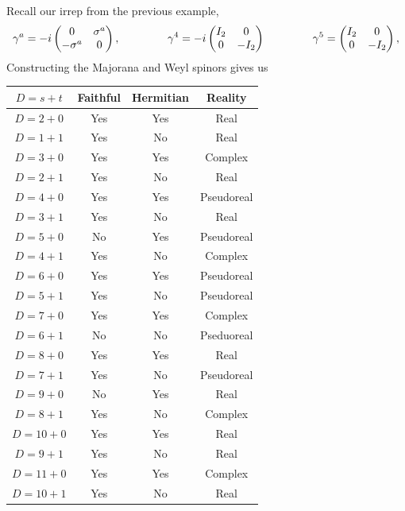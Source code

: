 \documentclass[11pt]{article}
\begin{document}
\begin{eexample}
    [Majorana and Weyl spinors in $D = 3 + 1$]
    Recall our irrep from the previous example,
    \begin{align*}
        \gamma^a = - i \begin{pmatrix}
            0 & \sigma^a\\
            - \sigma^a & 0
        \end{pmatrix},
        \hspace{1.5cm}
        \gamma^4 = -i \begin{pmatrix}
            I_2 & 0\\
            0 & -I_2
        \end{pmatrix}
        \hspace{1.5cm}
        \gamma^5 = \begin{pmatrix}
            I_2 & 0\\
            0 & -I_2
        \end{pmatrix},
    \end{align*}
    Constructing the Majorana and Weyl spinors gives us 
\end{eexample}


\begin{table}[H]
    \centering
    \begin{tabular}{|c|c|c|c|}
        \hline
        $D = s + t$ & Faithful & Hermitian & Reality\\
        \hline
        $D = 2 + 0$ & Yes & Yes & Real\\
        $D = 1 + 1$ & Yes & No & Real\\
        $D = 3 + 0$ & Yes & Yes & Complex\\
        $D = 2 + 1$ & Yes & No & Real\\
        $D = 4 + 0$ & Yes & Yes & Pseudoreal\\
        $D = 3 + 1$ & Yes & No & Real\\
        $D = 5 + 0$ & No & Yes & Pseudoreal\\
        $D = 4 + 1$ & Yes & No & Complex \\
        $D = 6 + 0$ & Yes & Yes & Pseudoreal\\
        $D = 5 + 1$ & Yes & No & Pseudoreal\\
        $D = 7 + 0$ & Yes & Yes & Complex\\
        $D = 6 + 1$ & No & No & Pseduoreal\\
        $D = 8 + 0$ & Yes & Yes & Real\\
        $D = 7 + 1$ & Yes & No & Pseudoreal\\
        $D = 9 + 0$ & No & Yes & Real\\
        $D = 8 + 1$ & Yes & No & Complex\\
        $D = 10 + 0$ & Yes & Yes & Real\\
        $D = 9 + 1$ & Yes & No & Real\\
        $D = 11 + 0$ & Yes & Yes & Complex\\
        $D = 10 + 1$ & Yes & No & Real\\
        \hline 
    \end{tabular}
\end{table}
\end{document}
